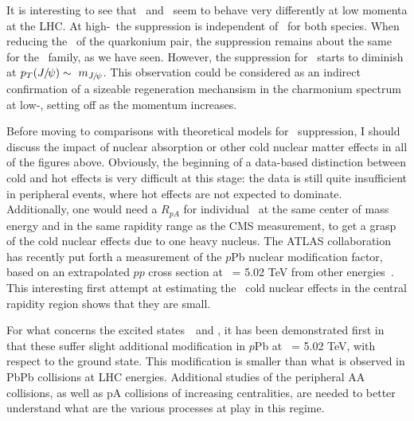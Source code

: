 It is interesting to see that \Jpsi\ and \PgU\ seem to behave very
differently at low momenta at the LHC. At high-\pt\, the suppression is
independent of \pt\ for both species. When reducing the \pt\ of the
quarkonium pair, the suppression remains about the same for the \PgU\ family, as
we have seen. However, the suppression for \Jpsi\ starts to diminish
at $p_{T}(J\hspace{-.08em}/\hspace{-.14em}\psi) \sim\ m_{J\hspace{-.08em}/\hspace{-.14em}\psi}$. This observation could be considered
as an indirect confirmation of a sizeable regeneration mechansism in the charmonium spectrum at low-\pt, setting off
as the momentum increases. 







Before moving to comparisons with theoretical models for \PgU\
suppression, I should discuss the impact of nuclear absorption or
other cold nuclear matter effects in all of the figures
above. Obviously, the beginning of a data-based distinction between cold and hot effects is
very difficult at this stage: the data is still quite insufficient in
peripheral events, where hot effects are not expected to
dominate. Additionally, one would need a $R_{pA}$ for individual \PgU\
at the same center of mass energy and in the same rapidity range as
the CMS measurement, to get a grasp of the cold nuclear effects due to
one heavy nucleus. The ATLAS collaboration has recently put forth a
measurement of the $p$Pb nuclear modification factor, based on an
extrapolated $pp$ cross section at \s\ = 5.02 TeV from other
energies~\cite{ATLAS-CONF-2015-050}. This interesting first attempt at
estimating the \PgUa\ cold nuclear effects in the central rapidity region
shows that they are small.

For what concerns the excited states~\PgUb\ and \PgUc, it has been
demonstrated first in~\cite{Chatrchyan:2013nza} that these suffer
slight additional modification in $p$Pb at \snn\ = 5.02 TeV, with
respect to the ground state. This modification is smaller than what is
observed in PbPb collisions at LHC energies. Additional studies of the
peripheral AA collisions, as well as pA collisions of increasing
centralities, are needed to better understand what are the various
processes at play in this regime. 

